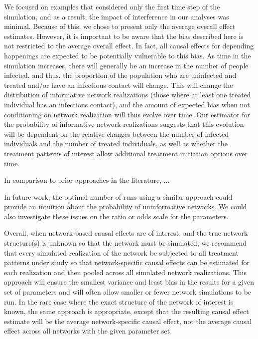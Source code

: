 \documentclass{article}
\theoremstyle{definition}
\begin{document}
We focused on examples that considered only the first time step of the simulation, and as a result, the impact of interference in our analyses was minimal. Because of this, we chose to present only the average overall effect estimates. However, it is important to be aware that the bias described here is not restricted to the average overall effect. In fact, all causal effects for depending happenings are expected to be potentially vulnerable to this bias. As time in the simulation increases, there will generally be an increase in the number of people infected, and thus, the proportion of the population who are uninfected and treated and/or have an infectious contact will change. This will change the distribution of informative network realizations (those where at least one treated individual has an infectious contact), and the amount of expected bias when not conditioning on network realization will thus evolve over time. Our estimator for the probability of informative network realizations suggests that this evolution will be dependent on the relative changes between the number of infected individuals and the number of treated individuals, as well as whether the treatment patterns of interest allow additional treatment initiation options over time.



In comparison to prior approaches in the literature, ...

In future work, the optimal number of runs using a similar approach could provide an intuition about the probability of uninformative networks. We could also investigate these issues on the ratio or odds scale for the parameters.

Overall, when network-based causal effects are of interest, and the true network structure(s) is unknown so that the network must be simulated, we recommend that every simulated realization of the network be subjected to all treatment patterns under study so that network-specific causal effects can be estimated for each realization and then pooled across all simulated network realizations. This approach will ensure the smallest variance and least bias in the results for a given set of parameters and will often allow smaller or fewer network simulations to be run. In the rare case where the exact structure of the network of interest is known, the same approach is appropriate, except that the resulting causal effect estimate will be the average network-specific causal effect, not the average causal effect across all networks with the given parameter set.
\end{document}
